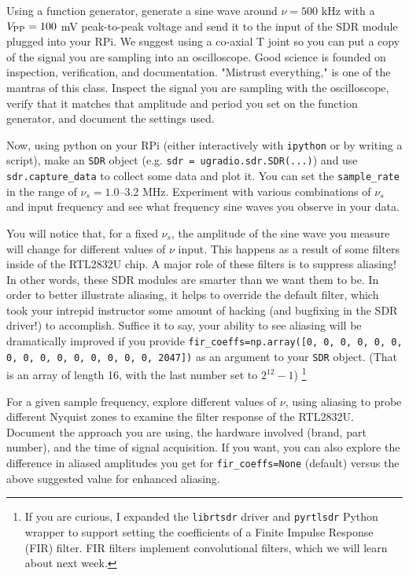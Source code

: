 \documentclass[11pt,preprint]{aastex}
\begin{document}
Using a function generator, generate a sine wave around $\nu=500$ kHz with a 
$V_{\rm PP}=100$ mV peak-to-peak
voltage and send it to the input of the SDR module plugged into your RPi.
We suggest using a co-axial T joint so
you can put a copy of the signal you are sampling into an oscilloscope.
Good science is founded on inspection, verification, and documentation.
"Mistrust everything," is one of the mantras of this class.
Inspect the signal you are sampling with the oscilloscope, verify that it matches that amplitude
and period you set on the function generator, and document the settings used.

Now, using python on your RPi (either interactively with {\tt ipython} or by writing
a script), make an {\tt SDR} object (e.g. {\tt sdr = ugradio.sdr.SDR(...)})
and use {\tt sdr.capture\_data} to collect some data and plot it.
You can set the {\tt sample\_rate} in the range of $\nu_s=1.0$--3.2 MHz. Experiment
with various combinations of $\nu_s$ and input frequency and see what frequency
sine waves you observe in your data.

You will notice that, for a fixed $\nu_s$, the amplitude
of the sine wave you measure will change for different values of $\nu$ input. This
happens as a result of some filters inside of the RTL2832U chip. A
major role of these filters is to suppress aliasing! In other words,
these SDR modules are smarter than we want them to be. In order to better
illustrate aliasing, it helps to override the default filter, which
took your intrepid instructor some amount of hacking (and bugfixing
in the SDR driver!) to accomplish. Suffice it to say, your ability
to see aliasing will be dramatically improved if you provide
{\tt fir\_coeffs=np.array([0, 0, 0, 0, 0, 0, 0, 0, 0, 
0, 0, 0, 0, 0, 0, 2047])} as
an argument to your {\tt SDR} object. (That is an array of length 16,
with the last number set to $2^{12}-1$) \footnote{If you are curious, 
I expanded the {\tt librtsdr} driver and {\tt pyrtlsdr} Python wrapper
to support setting the coefficients of a Finite Impulse Response
(FIR) filter. FIR filters implement convolutional filters, which we will
learn about next week.}

For a given sample frequency,
explore different values of $\nu$, using aliasing to probe different Nyquist zones to
examine the filter response of the RTL2832U.
Document the approach you are using,
the hardware involved (brand, part number), and the
time of signal acquisition. If you want, you can also explore the
difference in aliased amplitudes you get for {\tt fir\_coeffs=None}
(default) versus the above suggested value for enhanced aliasing.
\end{document}
